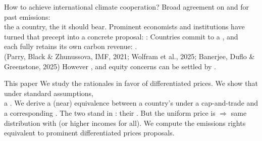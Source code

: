 \documentclass[aspectratio=169,xcolor=dvipsnames, 11pt,mathserif]{beamer}
\begin{document}
\begin{frame}{How to achieve international climate cooperation?\label{proposal}}
\bbvsp
\ip Broad agreement on  and  for past emissions: \\the {} a country, the  it should bear.
\ip Prominent economists and institutions have turned that precept into a concrete proposal: :
  \bbvsp
  \ip Countries commit to a , and \\each fully retains its own carbon revenue: . \\
  \quad (Parry, Black \& Zhunussova, IMF, 2021; Wolfram et al., 2025; Banerjee, Duflo \& Greenstone, 2025)
  \ee
\ip However , and equity concerns can be settled by . %
\ee
\end{frame}


\begin{frame}{This paper\label{contributions}}
\bbvsp
\ip We study the rationales in favor of differentiated prices.
\ip We show that under standard assumptions, \\a {}.
\ip We derive a (near) equivalence between a country's  under a cap-and-trade and a corresponding .%
  \bbvsp
  \ip The two stand in : their .
  \ip But the uniform price is  $\Rightarrow$ same distribution with  (or higher incomes for all).
  \ee
\ip We compute the emissions rights equivalent to prominent differentiated prices proposals.
\ee
\end{frame}
\end{document}
